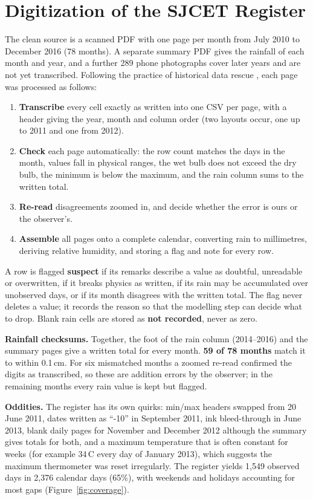 \section{Digitization of the SJCET Register}
\label{sec:digitization}

The clean source is a scanned PDF with one page per month from July 2010 to December 2016 (78 months). A separate summary PDF gives the rainfall of each month and year, and a further 289 phone photographs cover later years and are not yet transcribed. Following the practice of historical data rescue \cite{ref1,ref2,ref3}, each page was processed as follows:

\begin{enumerate}
    \item \textbf{Transcribe} every cell exactly as written into one CSV per page, with a header giving the year, month and column order (two layouts occur, one up to 2011 and one from 2012).
    \item \textbf{Check} each page automatically: the row count matches the days in the month, values fall in physical ranges, the wet bulb does not exceed the dry bulb, the minimum is below the maximum, and the rain column sums to the written total.
    \item \textbf{Re-read} disagreements zoomed in, and decide whether the error is ours or the observer's.
    \item \textbf{Assemble} all pages onto a complete calendar, converting rain to millimetres, deriving relative humidity, and storing a flag and note for every row.
\end{enumerate}

A row is flagged \textbf{suspect} if its remarks describe a value as doubtful, unreadable or overwritten, if it breaks physics as written, if its rain may be accumulated over unobserved days, or if its month disagrees with the written total. The flag never deletes a value; it records the reason so that the modelling step can decide what to drop. Blank rain cells are stored as \textbf{not recorded}, never as zero.

\textbf{Rainfall checksums.} Together, the foot of the rain column (2014--2016) and the summary pages give a written total for every month. \textbf{59 of 78 months} match it to within 0.1\,cm. For six mismatched months a zoomed re-read confirmed the digits as transcribed, so these are addition errors by the observer; in the remaining months every rain value is kept but flagged.

\label{sec:dig-oddities}\textbf{Oddities.} The register has its own quirks: min/max headers swapped from 20 June 2011, dates written as ``-10'' in September 2011, ink bleed-through in June 2013, blank daily pages for November and December 2012 although the summary gives totals for both, and a maximum temperature that is often constant for weeks (for example 34\,\textdegree C every day of January 2013), which suggests the maximum thermometer was reset irregularly. The register yields 1,549 observed days in 2,376 calendar days (65\%), with weekends and holidays accounting for most gaps (Figure~\ref{fig:coverage}).

